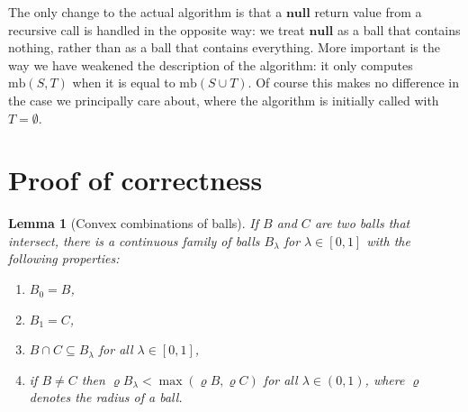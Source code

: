 \documentclass[a4paper]{article}
\newtheorem{lemma}{Lemma}[section]
\newcommand\undef{\mathbf{null}}
\newcommand\mb{\mathrm{mb}}
\let\boundary\partial
\let\radius\varrho
\begin{document}
\noindent The only change to the actual algorithm is that a $\undef$ return value from a recursive call is handled in the opposite way: we treat $\undef$ as a ball that contains nothing, rather than as a ball that contains everything. More important is the way we have weakened the description of the algorithm: it only computes $\mb(S, T)$ when it is equal to $\mb(S\cup T)$. Of course this makes no difference in the case we principally care about, where the algorithm is initially called with $T=\emptyset$.

\section{Proof of correctness}
\begin{lemma}[Convex combinations of balls]\label{lemma:cc}
  If $B$ and $C$ are two balls that intersect, there is a continuous family of balls $B_\lambda$ for $\lambda\in[0,1]$ with the following properties:
  \def\theenumi{\normalfont\roman{enumi})}\let\labelenumi\theenumi
  \begin{enumerate}
    \item\label{item:cc:0} $B_0=B$,
    \item\label{item:cc:1} $B_1=C$,
    \item\label{item:cc:intersection} $B\cap C\subseteq B_\lambda$ for all $\lambda\in[0,1]$,
    \item\label{item:cc:radius} if $B\neq C$ then $\radius B_\lambda < \max(\radius B, \radius C)$ for all $\lambda\in(0,1)$, where $\radius$ denotes the radius of a ball.
  \end{enumerate}
\end{lemma}
\end{document}
